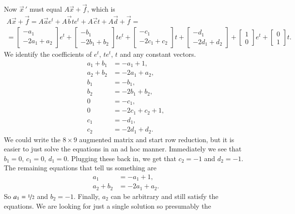 \documentclass[12pt]{book}
\begin{document}
\begin{example}
Now ${\vec{x}\,}'$ must equal $A\vec{x} + \vec{f}$, which is
\begin{multline*}
A \vec{x} + \vec{f} =
A \vec{a}
e^{t}
+
A \vec{b}
t e^{t}
+
A \vec{c}
t
+
A \vec{d}
+ \vec{f}
=
\\
=
\begin{bmatrix}
-a_1 \\ -2a_1+a_2
\end{bmatrix}
e^{t}
+
\begin{bmatrix}
-b_1 \\ -2b_1+b_2
\end{bmatrix}
t e^{t}
+
\begin{bmatrix}
-c_1 \\ -2c_1+c_2
\end{bmatrix}
t
+
\begin{bmatrix}
-d_1 \\ -2d_1+d_2
\end{bmatrix}
+
\begin{bmatrix}
1 \\ 0
\end{bmatrix} 
e^t
+
\begin{bmatrix}
0 \\ 1
\end{bmatrix} 
t .
\end{multline*}
We identify the coefficients of $e^t$, $te^t$, $t$ and any constant
vectors.
\begin{align*}
a_1+b_1 & = -a_1+1 , \\
a_2+b_2 & = -2a_1+a_2 , \\
b_1 & = -b_1 , \\
b_2 & = -2b_1+b_2 , \\
0 & = -c_1 , \\
0 & = -2c_1+c_2 + 1 , \\
c_1 & = -d_1 , \\
c_2 & = -2d_1+d_2 .
\end{align*}
We could write the $8 \times 9$ augmented matrix and start row
reduction, but it is easier to just solve the equations in an ad hoc
manner. Immediately we see that $b_1 = 0$, $c_1 = 0$, $d_1 = 0$.  Plugging
these
back in, we get that $c_2 = -1$ and $d_2 = -1$.  The remaining equations
that tell us something are
\begin{align*}
a_1 & = -a_1+1 , \\
a_2+b_2 & = -2a_1+a_2 .
\end{align*}
So $a_1 = \nicefrac{1}{2}$ and $b_2 = -1$.  Finally, $a_2$ can be arbitrary and still satisfy the
equations.  We are looking for just a single solution so presumably the

\end{example}
\end{document}
